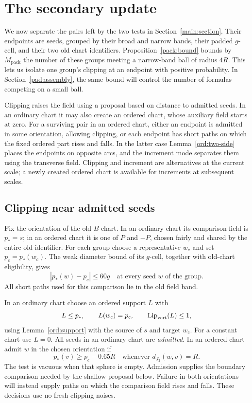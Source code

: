 \section{The secondary update}
\label{sec:secondary}

We now separate the pairs left by the two tests in
Section~\ref{main:section}. Their endpoints are seeds, grouped by their
broad and narrow bands, their padded $g$-cell, and their two old chart
identifiers. Proposition~\ref{pack:bound} bounds by $M_{\mathrm{pack}}$
the number of these groups meeting a narrow-band ball of radius $4R$.
This lets us isolate one group's clipping at an endpoint with positive
probability. In Section~\ref{pad:assembly}, the same bound will control
the number of formulas competing on a small ball.

Clipping raises the field using a proposal based on distance to admitted
seeds. In an ordinary chart it may also create an ordered chart, whose
auxiliary field starts at zero. For a surviving pair in an ordered chart,
either an endpoint is admitted in some orientation, allowing clipping,
or each endpoint has short paths on which the fixed ordered part rises
and falls. In the latter case Lemma~\ref{ord:two-side} places the
endpoints on opposite arcs, and the increment mode separates them using
the transverse field. Clipping and increment are alternatives at the
current scale; a newly created ordered chart is available for increments
at subsequent scales.

\subsection{Clipping near admitted seeds}
Fix the orientation of the old $B$ chart. In an ordinary chart its
comparison field is $p_*=s$; in an ordered chart it is one of $P$ and $-P$,
chosen fairly and shared by the entire old identifier. For each group
choose a representative $w_c$ and set $p_c=p_*(w_c)$. The weak diameter
bound of its $g$-cell, together with old-chart eligibility, gives
\begin{equation}\label{sec:variation}
 |p_*(w)-p_c|\le60g
 \quad\text{at every seed }w\text{ of the group}.
\end{equation}
All short paths used for this comparison lie in the old field band.

In an ordinary chart choose an ordered support $L$ with
\begin{equation}\label{sec:support}
 L\le p_*,\qquad L(w_c)=p_c,\qquad \operatorname{Lip}_{\mathrm{vert}}(L)\le1,
\end{equation}
using Lemma~\ref{ord:support} with the source of $s$ and target $w_c$.
For a constant chart use $L=0$. All seeds in an ordinary chart are
\emph{admitted}. In an ordered chart admit $w$ in the chosen orientation
if
\begin{equation}\label{sec:admission}
 p_*(v)\ge p_c-0.65R
 \quad\text{whenever }d_{J_2}(w,v)=R.
\end{equation}
The test is vacuous when that sphere is empty. Admission supplies the
boundary comparison needed by the shallow proposal below. Failure in
both orientations will instead supply paths on which the comparison
field rises and falls.
These decisions use no fresh clipping noises.

